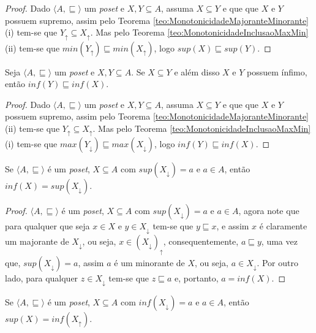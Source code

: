 \begin{proof}
	Dado $\langle A, \sqsubseteq \rangle$ um \textit{poset} e $X, Y \subseteq A$, assuma $X \subseteq Y$ e que que $X$ e $Y$ possuem supremo, assim pelo Teorema \ref{teo:MonotonicidadeMajoranteMinorante}(i) tem-se que $Y_\uparrow \subseteq X_\uparrow$.  Mas pelo Teorema \ref{teo:MonotonicidadeInclusaoMaxMin}(ii) tem-se que $min(Y_\uparrow) \sqsubseteq min(X_\uparrow)$, logo $sup(X) \sqsubseteq sup(Y)$.
\end{proof}

\begin{teorema}
	Seja $\langle A, \sqsubseteq \rangle$ um \textit{poset} e $X, Y \subseteq A$. Se $X \subseteq Y$ e além disso $X$ e $Y$ possuem ínfimo, então $inf(Y) \sqsubseteq inf(X)$.
\end{teorema}

\begin{proof}
	Dado $\langle A, \sqsubseteq \rangle$ um \textit{poset} e $X, Y \subseteq A$, assuma $X \subseteq Y$ e que que $X$ e $Y$ possuem supremo, assim pelo Teorema \ref{teo:MonotonicidadeMajoranteMinorante}(ii) tem-se que $Y_\uparrow \subseteq X_\uparrow$.  Mas pelo Teorema \ref{teo:MonotonicidadeInclusaoMaxMin}(i) tem-se que $max(Y_\downarrow) \sqsubseteq max(X_\downarrow)$, logo $inf(Y) \sqsubseteq inf(X)$.
\end{proof}

\begin{teorema}\label{teo:InfimoApartirSupremo}
	Se $\langle A, \sqsubseteq \rangle$ é um \textit{poset}, $X \subseteq A$ com $sup(X_\downarrow) = a$ e $a \in A$, então $inf(X) = sup(X_\downarrow) $.
\end{teorema}

\begin{proof}
	$\langle A, \sqsubseteq \rangle$ é um \textit{poset}, $X \subseteq A$ com $sup(X_\downarrow) = a$ e $a \in A$, agora note que para qualquer que seja $x \in X$ e $y \in X_\downarrow$ tem-se que $y \sqsubseteq x$, e assim $x$ é claramente um majorante de $X_\downarrow$, ou seja, $x \in (X_\downarrow)_\uparrow$,  consequentemente, $a \sqsubseteq y$, uma vez que, $sup(X_\downarrow) = a$, assim $a$ é um minorante de $X$, ou seja, $a \in X_\downarrow$. Por outro lado, para qualquer $z \in X_\downarrow$ tem-se que $z \sqsubseteq a$ e, portanto, $a = inf(X)$.
\end{proof}

\begin{teorema}\label{teo:SupremoApartirInfimo}
	Se $\langle A, \sqsubseteq \rangle$ é um \textit{poset}, $X \subseteq A$ com $inf(X_\downarrow) = a$ e $a \in A$, então $sup(X) = inf(X_\uparrow) $.
\end{teorema}

